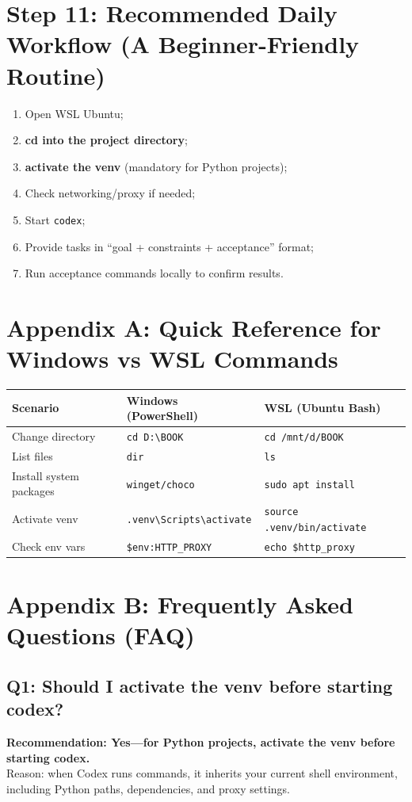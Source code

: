 \documentclass[11pt,a4paper]{article}
\begin{document}
\section{Step 11: Recommended Daily Workflow (A Beginner-Friendly Routine)}
\begin{enumerate}[leftmargin=1.7em]
  \item Open WSL Ubuntu;
  \item \textbf{cd into the project directory};
  \item \textbf{activate the venv} (mandatory for Python projects);
  \item Check networking/proxy if needed;
  \item Start \texttt{codex};
  \item Provide tasks in ``goal + constraints + acceptance'' format;
  \item Run acceptance commands locally to confirm results.
\end{enumerate}

\section{Appendix A: Quick Reference for Windows vs WSL Commands}
\begin{longtable}{@{}p{}p{}p{}@{}}
\toprule
Scenario & Windows (PowerShell) & WSL (Ubuntu Bash) \\
\midrule
Change directory & \texttt{cd D:\textbackslash BOOK} & \texttt{cd /mnt/d/BOOK} \\
List files & \texttt{dir} & \texttt{ls} \\
Install system packages & \texttt{winget/choco} & \texttt{sudo apt install} \\
Activate venv & \texttt{.venv\textbackslash Scripts\textbackslash activate} & \texttt{source .venv/bin/activate} \\
Check env vars & \texttt{\$env:HTTP\_PROXY} & \texttt{echo \$http\_proxy} \\
\bottomrule
\end{longtable}

\section{Appendix B: Frequently Asked Questions (FAQ)}
\subsection*{Q1: Should I activate the venv before starting codex?}
\textbf{Recommendation: Yes---for Python projects, activate the venv before starting codex.}\\
Reason: when Codex runs commands, it inherits your current shell environment, including Python paths, dependencies, and proxy settings.
\end{document}
